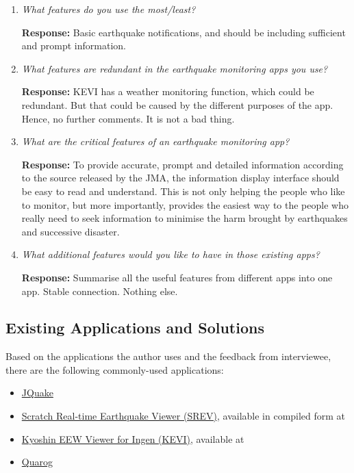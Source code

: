 \begin{enumerate}
    \item \textit{What features do you use the most/least?}

          \textbf{Response:} Basic earthquake notifications, and should be including sufficient and prompt information.

    \item \textit{What features are redundant in the earthquake monitoring apps you use?}

          \textbf{Response:} KEVI has a weather monitoring function, which could be redundant. But that could be caused by the different purposes of the app. Hence, no further comments. It is not a bad thing.

    \item \textit{What are the critical features of an earthquake monitoring app?}

          \textbf{Response:} To provide accurate, prompt and detailed information according to the source released by the JMA, the information display interface should be easy to read and understand. This is not only helping the people who like to monitor, but more importantly, provides the easiest way to the people who really need to seek information to minimise the harm brought by earthquakes and successive disaster.

    \item \textit{What additional features would you like to have in those existing apps?}

          \textbf{Response:} Summarise all the useful features from different apps into one app. Stable connection. Nothing else.
\end{enumerate}

\subsection{Existing Applications and Solutions}

Based on the applications the author uses and the feedback from interviewee, there are the following commonly-used applications:
\begin{itemize}
    \item \href{https://jquake.net}{JQuake}
    \item \href{https://kotoho7.github.io/scratch-realtime-earthquake-viewer-page/}{Scratch Real-time Earthquake Viewer (SREV)}, available in compiled form at 
    \item \href{https://svs.ingen084.net/kyoshineewviewer/}{Kyoshin EEW Viewer for Ingen (KEVI)}, available at 
    \item \href{https://fuku1213.github.io/quarog-site/}{Quarog}
\end{itemize}

